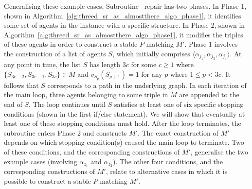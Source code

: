 Generalising these example cases, Subroutine~ repair has two phases. In Phase 1, shown in Algorithm~\ref{alg:threed_sr_as_almostthere_algo_phase1}, it identifies some set of agents in the instance with a specific structure. In Phase 2, shown in Algorithm~\ref{alg:threed_sr_as_almostthere_algo_phase1}, it modifies the triples of these agents in order to construct a stable $P$\nobreakdash-matching $M'$. Phase 1 involves the construction of a list of agents $S$, which initially comprises $\langle \alpha_{j_1}, \alpha_{j_3},\allowbreak \alpha_{j_4} \rangle$. At any point in time, the list $S$ has length $3c$ for some $c \geq 1$ where $\{ S_{3c-2}, S_{3c-1}, S_{3c} \} \in M$ and $v_{S_p}(S_{p+1})=1$ for any $p$ where $1 \leq p < 3c$. It follows that $S$ corresponds to a path in the underlying graph. In each iteration of the main loop, three agents belonging to some triple in $M$ are appended to the end of $S$. The loop continues until $S$ satisfies at least one of six specific stopping conditions (shown in the first if/else statement). We will show that eventually at least one of these stopping conditions must hold. After the loop terminates, the subroutine enters Phase 2 and constructs $M'$. The exact construction of $M'$ depends on which stopping condition(s) caused the main loop to terminate. Two of these conditions, and the corresponding constructions of $M'$, generalise the two example cases (involving $\alpha_{z_1}$ and $\alpha_{z_2}$). The other four conditions, and the corresponding constructions of $M'$, relate to alternative cases in which it is possible to construct a stable $P$\nobreakdash-matching $M'$.



